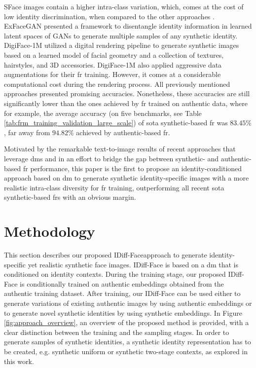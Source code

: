 \documentclass[10pt,twocolumn,letterpaper]{article}
\newcommand{\approachname}{IDiff-Face }
\newcommand{\approachnamewithoutspace}{IDiff-Face}
\begin{document}
SFace \cite{Boutros2022SFace} images contain a higher intra-class variation, which, comes at the cost of low identity discrimination, when compared to the other approaches \cite{FBoutros2022USynthFace}. 
ExFaceGAN \cite{ExFaceGAN} presented a framework to disentangle identity information in
learned latent spaces of GANs to generate multiple samples of any synthetic identity. 
DigiFace-1M \cite{DigiFace1M} utilized a digital rendering pipeline to generate synthetic images based on a learned model of facial geometry and a collection of textures, hairstyles, and 3D accessories. DigiFace-1M \cite{DigiFace1M} also applied aggressive data augmentations for their \acrshort{fr} training. However, it comes at a considerable computational cost during the rendering process. 
All previously mentioned approaches presented promising accuracies. Nonetheless, these accuracies are still significantly lower than the ones achieved by \acrshort{fr} trained on authentic data, where for example, the average accuracy (on five benchmarks, see Table \ref{tab:frm_training_validation_large_scale}) of \acrshort{sota} synthetic-based \acrshort{fr} was $83.45\%$, far away from $94.82\%$ achieved by authentic-based \acrshort{fr}.

Motivated by the remarkable text-to-image results of recent approaches that leverage \acrshort{dm}s \cite{Rombach2021, Ramesh2022, Saharia2022} and in an effort to bridge the gap between synthetic- and authentic-based \acrshort{fr} performance, this paper is the first to propose an identity-conditioned approach based on \acrshort{dm} to generate synthetic identity-specific images with a more realistic intra-class diversity for \acrshort{fr} training, outperforming all recent \acrshort{sota} synthetic-based \acrshort{fr}s with an obvious margin. 


\vspace{-3mm}
\section{Methodology }
\vspace{-2mm}
This section describes our proposed \approachnamewithoutspace approach to generate identity-specific yet realistic synthetic face images. \approachname is based on a \acrshort{dm} that is conditioned on identity contexts. During the training stage, our proposed \approachname is conditionally trained on authentic embeddings obtained from the authentic training dataset. After training, our \approachname can be used either to generate variations of existing authentic images by using authentic embeddings or to generate novel synthetic identities by using synthetic embeddings. In Figure \ref{fig:approach_overview}, an overview of the proposed method is provided, with a clear distinction between the training and the sampling stages. In order to generate samples of synthetic identities, a synthetic identity representation has to be created, e.g. synthetic uniform or synthetic two-stage contexts, as explored in this work.
\vspace{-1mm}
\end{document}
